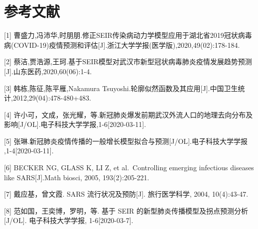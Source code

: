 \documentclass[12pt,hyperref,]{ctexart}
\begin{document}
\hypertarget{ux53c2ux8003ux6587ux732e}{%
\section*{参考文献}\label{ux53c2ux8003ux6587ux732e}}

{[}1{]}
曹盛力,冯沛华,时朋朋.修正SEIR传染病动力学模型应用于湖北省2019冠状病毒病(COVID-19)疫情预测和评估{[}J{]}.浙江大学学报(医学版),2020,49(02):178-184.

{[}2{]}
蔡洁,贾浩源,王珂.基于SEIR模型对武汉市新型冠状病毒肺炎疫情发展趋势预测{[}J{]}.山东医药,2020,60(06):1-4.

{[}3{]} 韩栋,陈征,陈平雁,Nakamura
Tsuyoshi.轮廓似然函数及其应用{[}J{]}.中国卫生统计,2012,29(04):478-480+483.

{[}4{]}
许小可，文成，张光耀，等.新冠肺炎爆发前期武汉外流人口的地理去向分布及影响{[}J/OL{]}.电子科技大学学报,1-6{[}2020-03-11{]}.

{[}5{]}
张琳.新冠肺炎疫情传播的一般增长模型拟合与预测{[}J/OL{]}.电子科技大学学报
,1-4{[}2020-03-11{]}.

{[}6{]} BECKER NG, GLASS K, LI Z, et al.~Controlling emerging infectious
diseases like SARS{[}J{]}.Math biosci, 2005, 193(2):205-221.

{[}7{]} 戴应基，曾文霞. SARS 流行状况及预防{[}J{]}. 旅行医学科学, 2004,
10(4):43-47.

{[}8{]} 范如国，王奕博，罗明，等. 基于 SEIR
的新型肺炎传播模型及拐点预测分析{[}J/OL{]}. 电子科技大学学报,
1-6{[}2020-03-7{]}.
\end{document}

